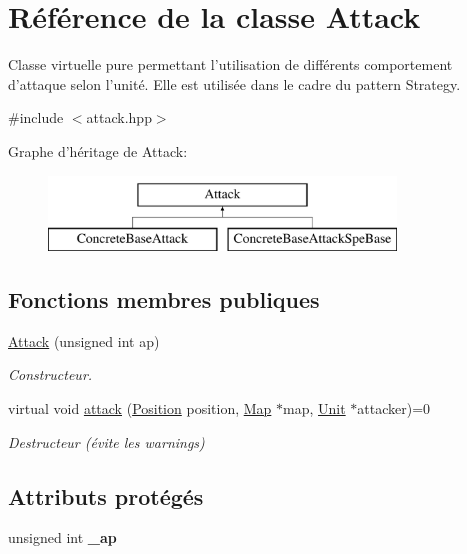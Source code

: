 \hypertarget{classAttack}{\section{Référence de la classe Attack}
\label{classAttack}
}


Classe virtuelle pure permettant l'utilisation de différents comportement d'attaque selon l'unité. Elle est utilisée dans le cadre du pattern Strategy.  




{\ttfamily \#include $<$attack.\+hpp$>$}

Graphe d'héritage de Attack\+:\begin{figure}[H]
\begin{center}
\leavevmode
\includegraphics[height=2.000000cm]{classAttack}
\end{center}
\end{figure}
\subsection*{Fonctions membres publiques}
\begin{DoxyCompactItemize}
\item 
\hypertarget{classAttack_ab7a4ca023e07dd3c94ea31c081046f9e}{\hyperlink{classAttack_ab7a4ca023e07dd3c94ea31c081046f9e}{Attack} (unsigned int ap)}\label{classAttack_ab7a4ca023e07dd3c94ea31c081046f9e}

\begin{DoxyCompactList}\small\item\em Constructeur. \end{DoxyCompactList}\item 
virtual void \hyperlink{classAttack_aa741caafef0d80bb0a00ce39e5bf6e2d}{attack} (\hyperlink{classPosition}{Position} position, \hyperlink{classMap}{Map} $\ast$map, \hyperlink{classUnit}{Unit} $\ast$attacker)=0
\begin{DoxyCompactList}\small\item\em Destructeur (évite les warnings) \end{DoxyCompactList}\end{DoxyCompactItemize}
\subsection*{Attributs protégés}
\begin{DoxyCompactItemize}
\item 
\hypertarget{classAttack_a33e2aea32bc58913dbde9f66bcadf981}{unsigned int {\bfseries \+\_\+ap}}\label{classAttack_a33e2aea32bc58913dbde9f66bcadf981}

\end{DoxyCompactItemize}


